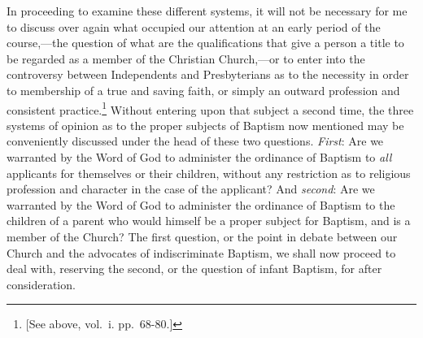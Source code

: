 \documentclass[english,]{book}
\begin{document}
In proceeding to examine these different systems, it will not be necessary for me to discuss over again what occupied our attention at an early period of the course,---the question of what are the qualifications that give a person a title to be regarded as a member of the Christian Church,---or to enter into the controversy between Independents and Presbyterians as to the necessity in order to membership of a true and saving faith, or simply an outward profession and consistent practice.\footnote{{[}See above, vol.~i. pp.~68-80.{]}} Without entering upon that subject a second time, the three systems of opinion as to the proper subjects of Baptism now mentioned may be conveniently discussed under the head of these two questions. \emph{First}: Are we warranted by the Word of God to administer the ordinance of Baptism to \emph{all} applicants for themselves or their children, without any restriction as to religious profession and character in the case of the applicant? And \emph{second}: Are we warranted by the Word of God to administer the ordinance of Baptism to the children of a parent who would himself be a proper subject for Baptism, and is a member of the Church? The first question, or the point in debate between our Church and the advocates of indiscriminate Baptism, we shall now proceed to deal with, reserving the second, or the question of infant Baptism, for after consideration.
\end{document}
